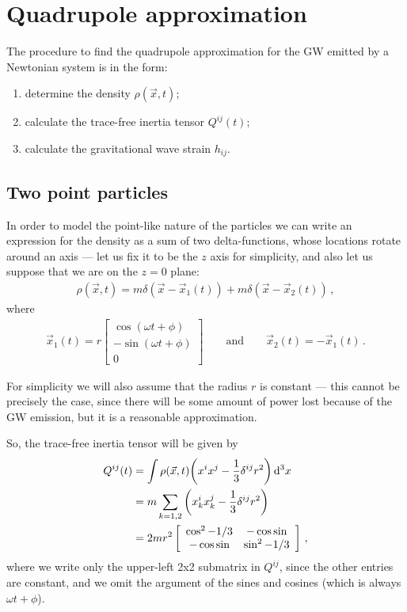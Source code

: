 \documentclass[main.tex]{subfiles}
\begin{document}
\section{Quadrupole approximation}

The procedure to find the quadrupole approximation 
for the GW emitted by a Newtonian system is in the form: 
\begin{enumerate}
    \item determine the density \(\rho (\vec{x}, t)\);
    \item calculate the trace-free inertia tensor \(Q^{ij}(t)\);
    \item calculate the gravitational wave strain \(h_{ij}\). 
\end{enumerate}

\subsection{Two point particles}

In order to model the point-like nature of the particles we can write an expression for the density as a sum of two delta-functions,
whose locations rotate around an axis --- let us fix it to be
the \(z\) axis for simplicity, 
and also let us suppose that we are on the \(z = 0 \) plane: 
%
\begin{align}
\rho (\vec{x}, t) = m\delta (\vec{x} - \vec{x}_1(t)) + m\delta (\vec{x} - \vec{x}_2 (t))                                                                        
\,,
\end{align}
%
where 
%
\begin{align}
\vec{x}_1 (t) = r \left[\begin{array}{c}
\cos(\omega t + \phi ) \\ 
- \sin(\omega t + \phi ) \\ 
0
\end{array}\right]
\qquad \text{and} \qquad
\vec{x}_2 (t) = - \vec{x}_1 (t)
\,.
\end{align}

For simplicity we will also assume that the radius \(r\) is constant --- this cannot be precisely the case, since there will be some amount of power lost because of the GW emission, but it is a reasonable approximation.

So, the trace-free inertia tensor will be given by 
%
\begin{align}
Q^{ij} (t) &= \int \rho (\vec{x}, t) \qty( x^{i} x^{j} - \frac{1}{3} \delta^{ij} r^2) \dd[3]{x}  \\
&= m \sum _{k=1, 2} \qty(x_k^{i} x_k^{j} - \frac{1}{3} \delta^{ij} r^2)  \\
&= 2 m r^2 \left[\begin{array}{cc}
\cos^2 - 1/3 & - \cos \sin \\ 
- \cos \sin & \sin^2 - 1/3  
\end{array}\right] 
\,,
\end{align}
%
where we write only the upper-left 2x2 submatrix in \(Q^{ij}\), since the other entries are constant, and we omit the argument of the sines and cosines (which is always \(\omega t + \phi \)). 
\end{document}
